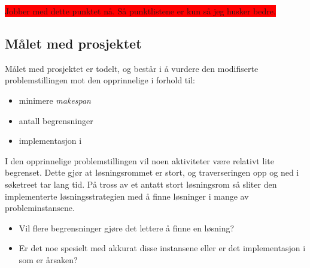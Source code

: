 \colorbox{red}{Jobber med dette punktet nå. Så punktlistene er kun så jeg husker bedre.}

\subsection{Målet med prosjektet}
Målet med prosjektet er todelt, og består i å vurdere den modifiserte problemstillingen mot den opprinnelige i forhold til:
\begin{itemize}
\item minimere \textit{makespan}
\item antall begrensninger
\item implementasjon i \ilog
\end{itemize}

I den opprinnelige problemstillingen vil noen aktiviteter være relativt lite begrenset. Dette gjør at løsningsrommet er stort, og traverseringen opp og ned i søketreet tar lang tid. På tross av et antatt stort løsningsrom så sliter den \ilog implementerte løsningsstrategien med å finne løsninger i mange av probleminstansene.

\begin{itemize}
\item Vil flere begrensninger gjøre det lettere å finne en løsning?
\item Er det noe spesielt med akkurat disse instansene eller er det implementasjon i \ilog som er årsaken?
\end{itemize}